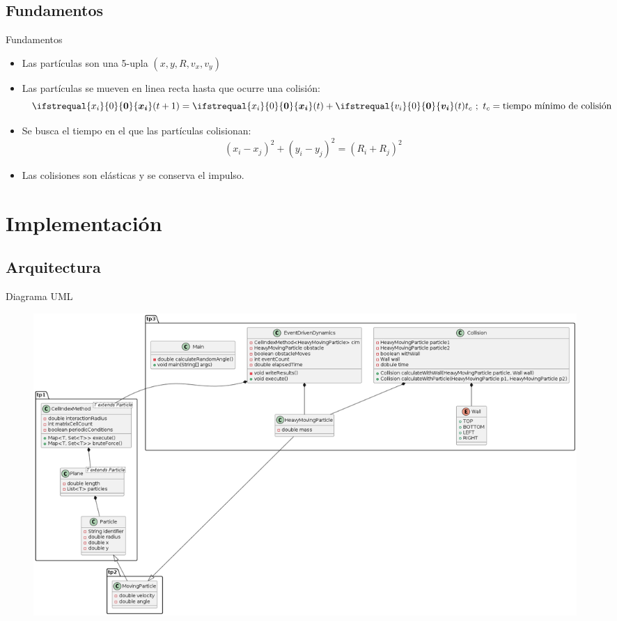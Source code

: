 \documentclass{beamer}
\renewcommand\vec[1]{\ifstrequal{#1}{0}{\ensuremath{\mathbf{0}}}{\ensuremath{\boldsymbol{#1}}}}
\begin{document}
        \subsection{Fundamentos}

            \begin{frame}{Fundamentos}
                \begin{itemize}
                    \item Las partículas son una 5-upla $(x, y, R, v_x, v_y)$
                    \item Las partículas se mueven en linea recta hasta que ocurre una colisión:
                        \begin{equation*}
                            \vec{x_i}(t+1) = \vec{x_i}(t) + \vec{v_i}(t) t_c\ ; \ t_c = \text{tiempo mínimo de colisión}
                        \end{equation*}
                    \item Se busca el tiempo en el que las partículas colisionan:
                        \begin{equation*}
                            \left( x_i - x_j \right) ^2 + \left( y_i - y_j \right) ^2 = \left( R_i + R_j \right) ^2
                        \end{equation*}
                    \item Las colisiones son elásticas y se conserva el impulso.
                \end{itemize}
            \end{frame}

    \section{Implementación}

        \subsection{Arquitectura}

            \begin{frame}{Diagrama UML}
                \begin{figure}[htbp]
                    \centering
                    \includegraphics[width=\textwidth]{./architecture}
                    \label{fig:architecture}
                \end{figure}
            \end{frame}
\end{document}
